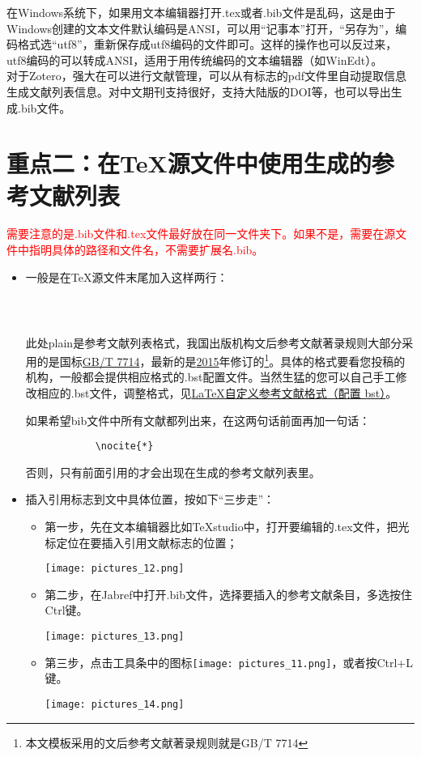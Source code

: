 \documentclass[cn,geye,cyan,normal,14pt]{elegantnote}
\begin{document}
	\begin{note}
在Windows系统下，如果用文本编辑器打开.tex或者.bib文件是乱码，这是由于Windows创建的文本文件默认编码是ANSI，可以用“记事本”打开，“另存为”，编码格式选“utf8”，重新保存成utf8编码的文件即可。这样的操作也可以反过来，utf8编码的可以转成ANSI，适用于用传统编码的文本编辑器（如WinEdt）。\\
对于Zotero，强大在可以进行文献管理，可以从有标志的pdf文件里自动提取信息生成文献列表信息。对中文期刊支持很好，支持大陆版的DOI等，也可以导出生成.bib文件。
	\end{note}
\section{重点二：在\TeX 源文件中使用生成的参考文献列表}
\textcolor{red}{需要注意的是.bib文件和.tex文件最好放在同一文件夹下。如果不是，需要在源文件中指明具体的路径和文件名，不需要扩展名.bib。}
\begin{itemize}
	\item 一般是在\TeX 源文件末尾加入这样两行：
		\begin{lstlisting}
			
			
		\end{lstlisting}
			\begin{note}
				此处plain是参考文献列表格式，我国出版机构文后参考文献著录规则大部分采用的是国标\href{http://www.sac.gov.cn/SACSearch/outlinetemplet/gjbzcx.jsp}{GB/T 7714}\cite{gbt7714_2015}，最新的是\href{http://www.scal.edu.cn/dxtsgxb/201906120155}{2015}年修订的\footnote{本文模板采用的文后参考文献著录规则就是GB/T 7714}。具体的格式要看您投稿的机构，一般都会提供相应格式的.bst配置文件。当然生猛的您可以自己手工修改相应的.bst文件，调整格式，见\href{https://blog.csdn.net/chikily_yongfeng/article/details/86553359}{\LaTeX 自定义参考文献格式（配置 bst）}\cite{noauthor_latex_nodate}。
			\end{note}
如果希望bib文件中所有文献都列出来，在这两句话前面再加一句话：
		\begin{lstlisting}
			\nocite{*}
		\end{lstlisting}
否则，只有前面引用的才会出现在生成的参考文献列表里。
	\item 插入引用标志到文中具体位置，按如下“三步走”：
		\begin{itemize}
			\item 第一步，先在文本编辑器比如\TeX studio中，打开要编辑的.tex文件，把光标定位在要插入引用文献标志的位置；
			\begin{center}
			\texttt{[image: pictures\_12.png]}
			\end{center}
		\item 第二步，在Jabref中打开.bib文件，选择要插入的参考文献条目，多选按住Ctrl键。
			\begin{center}
			\texttt{[image: pictures\_13.png]}
			\end{center}
		\item 第三步，点击工具条中的图标\texttt{[image: pictures\_11.png]}，或者按Ctrl+L键。
			\begin{center}
			\texttt{[image: pictures\_14.png]}
			\end{center}
		\end{itemize}
\end{itemize}
\end{document}
